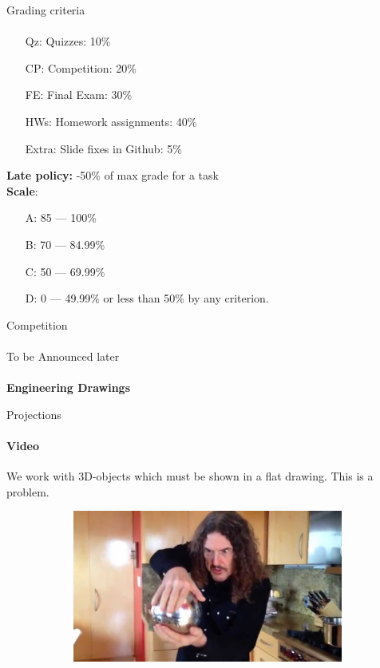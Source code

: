 \documentclass[aspectratio=169]{beamer}
\begin{document}
\begin{frame}[t]{Grading criteria}
    \framesubtitle{}
    \vspace{-0.6cm}
    \begin{itemize}
        \item[Qz:] Quizzes: 10\% 
        \item[CP:] Competition: 20\%
        \item[FE:] Final Exam: 30\%
        \item[HWs:] Homework assignments: 40\%
        \item[Extra:] Slide fixes in Github: 5\% 
    \end{itemize}
    \textbf{Late policy:} -50\% of max grade for a task \\
    \textbf{Scale}:
    \begin{itemize}
        \item[A:] 85 --- 100\%
        \item[B:] 70 --- 84.99\%
        \item[C:] 50 --- 69.99\%
        \item[D:] 0 --- 49.99\% or less than 50\% by any criterion.
    \end{itemize}
\end{frame}

\begin{frame}[c]{Competition}
    \framesubtitle{}
    \LARGE \centering To be Announced later
\end{frame}

\begin{frame}[c]{}
    \framesubtitle{}
    \LARGE \centering
    \textbf{Engineering Drawings}
\end{frame}

\begin{frame}[t]{Projections}
    \framesubtitle{Video}
    \vspace{-0.3cm}
    We work with 3D-objects which must be shown in a flat drawing. This is a problem.

    \begin{figure}[H]
        \href{https://youtu.be/_SZkh6w_4EA}{
            \centering\includegraphics[height=5cm,width=1\textwidth,keepaspectratio]{resources/projection_video.jpg}}
        \label{fig:resources/projection_video.jpg}
    \end{figure}
\end{frame}
\end{document}
